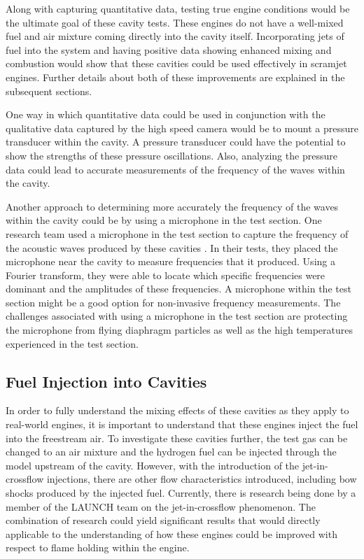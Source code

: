 Along with capturing quantitative data, testing true engine conditions would be the ultimate goal of these cavity tests. These engines do not have a well-mixed fuel and air mixture coming directly into the cavity itself. Incorporating jets of fuel into the system and having positive data showing enhanced mixing and combustion would show that these cavities could be used effectively in scramjet engines. Further details about both of these improvements are explained in the subsequent sections.

One way in which quantitative data could be used in conjunction with the qualitative data captured by the high speed camera would be to mount a pressure transducer within the cavity. A pressure transducer could have the potential to show the strengths of these pressure oscillations. Also, analyzing the pressure data could lead to accurate measurements of the frequency of the waves within the cavity.

Another approach to determining more accurately the frequency of the waves within the cavity could be by using a microphone in the test section. One research team used a microphone in the test section to capture the frequency of the acoustic waves produced by these cavities \cite{yu1994cavity}. In their tests, they placed the microphone near the cavity to measure frequencies that it produced. Using a Fourier transform, they were able to locate which specific frequencies were dominant and the amplitudes of these frequencies. A microphone within the test section might be a good option for non-invasive frequency measurements. The challenges associated with using a microphone in the test section are protecting the microphone from flying diaphragm particles as well as the high temperatures experienced in the test section. 

\subsection{Fuel Injection into Cavities}

In order to fully understand the mixing effects of these cavities as they apply to real-world engines, it is important to understand that these engines inject the fuel into the freestream air. To investigate these cavities further, the test gas can be changed to an air mixture and the hydrogen fuel can be injected through the model upstream of the cavity. However, with the introduction of the jet-in-crossflow injections, there are other flow characteristics introduced, including bow shocks produced by the injected fuel. Currently, there is research being done by a member of the LAUNCH team on the jet-in-crossflow phenomenon. The combination of research could yield significant results that would directly applicable to the understanding of how these engines could be improved with respect to flame holding within the engine. 





\newpage


